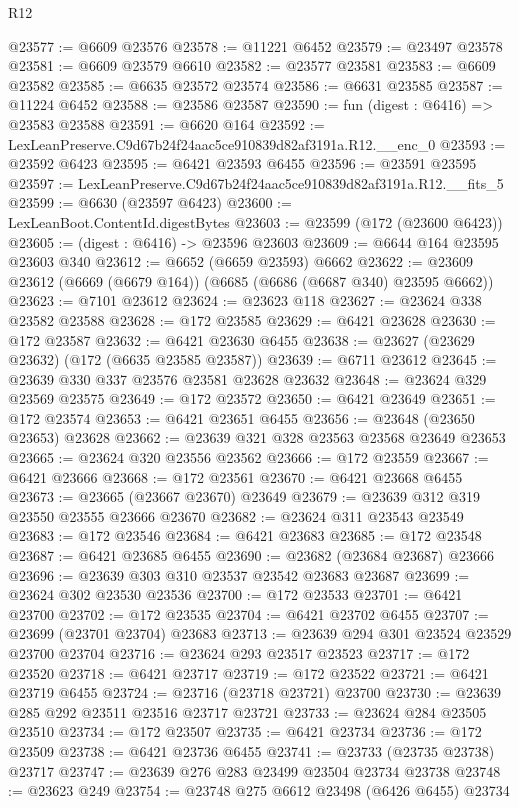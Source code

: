 \begin{lexlean}{R12}
\begin{coremodule}
@23577 := @6609 @23576
@23578 := @11221 @6452
@23579 := @23497 @23578
@23581 := @6609 @23579 @6610
@23582 := @23577 @23581
@23583 := @6609 @23582
@23585 := @6635 @23572 @23574
@23586 := @6631 @23585
@23587 := @11224 @6452
@23588 := @23586 @23587
@23590 := fun (digest : @6416) => @23583 @23588
@23591 := @6620 @164
@23592 := LexLeanPreserve.C9d67b24f24aac5ce910839d82af3191a.R12.__enc_0
@23593 := @23592 @6423
@23595 := @6421 @23593 @6455
@23596 := @23591 @23595
@23597 := LexLeanPreserve.C9d67b24f24aac5ce910839d82af3191a.R12.__fits_5
@23599 := @6630 (@23597 @6423)
@23600 := LexLeanBoot.ContentId.digestBytes
@23603 := @23599 (@172 (@23600 @6423))
@23605 := (digest : @6416) -> @23596 @23603
@23609 := @6644 @164 @23595 @23603 @340
@23612 := @6652 (@6659 @23593) @6662
@23622 := @23609 @23612 (@6669 (@6679 @164)) (@6685 (@6686 (@6687 @340) @23595 @6662))
@23623 := @7101 @23612
@23624 := @23623 @118
@23627 := @23624 @338 @23582 @23588
@23628 := @172 @23585
@23629 := @6421 @23628
@23630 := @172 @23587
@23632 := @6421 @23630 @6455
@23638 := @23627 (@23629 @23632) (@172 (@6635 @23585 @23587))
@23639 := @6711 @23612
@23645 := @23639 @330 @337 @23576 @23581 @23628 @23632
@23648 := @23624 @329 @23569 @23575
@23649 := @172 @23572
@23650 := @6421 @23649
@23651 := @172 @23574
@23653 := @6421 @23651 @6455
@23656 := @23648 (@23650 @23653) @23628
@23662 := @23639 @321 @328 @23563 @23568 @23649 @23653
@23665 := @23624 @320 @23556 @23562
@23666 := @172 @23559
@23667 := @6421 @23666
@23668 := @172 @23561
@23670 := @6421 @23668 @6455
@23673 := @23665 (@23667 @23670) @23649
@23679 := @23639 @312 @319 @23550 @23555 @23666 @23670
@23682 := @23624 @311 @23543 @23549
@23683 := @172 @23546
@23684 := @6421 @23683
@23685 := @172 @23548
@23687 := @6421 @23685 @6455
@23690 := @23682 (@23684 @23687) @23666
@23696 := @23639 @303 @310 @23537 @23542 @23683 @23687
@23699 := @23624 @302 @23530 @23536
@23700 := @172 @23533
@23701 := @6421 @23700
@23702 := @172 @23535
@23704 := @6421 @23702 @6455
@23707 := @23699 (@23701 @23704) @23683
@23713 := @23639 @294 @301 @23524 @23529 @23700 @23704
@23716 := @23624 @293 @23517 @23523
@23717 := @172 @23520
@23718 := @6421 @23717
@23719 := @172 @23522
@23721 := @6421 @23719 @6455
@23724 := @23716 (@23718 @23721) @23700
@23730 := @23639 @285 @292 @23511 @23516 @23717 @23721
@23733 := @23624 @284 @23505 @23510
@23734 := @172 @23507
@23735 := @6421 @23734
@23736 := @172 @23509
@23738 := @6421 @23736 @6455
@23741 := @23733 (@23735 @23738) @23717
@23747 := @23639 @276 @283 @23499 @23504 @23734 @23738
@23748 := @23623 @249
@23754 := @23748 @275 @6612 @23498 (@6426 @6455) @23734

\end{coremodule}
\end{lexlean}
